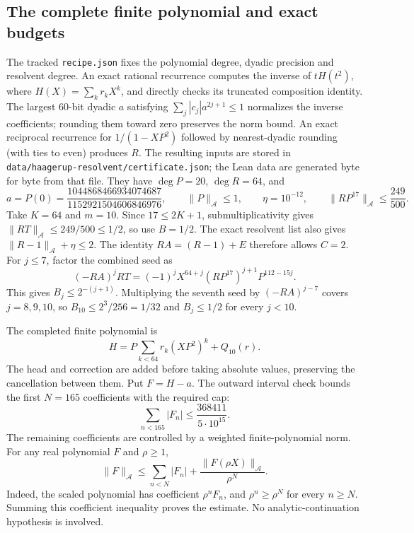 \subsection{The complete finite polynomial and exact budgets}
The tracked \texttt{recipe.json} fixes the polynomial degree, dyadic precision
and resolvent degree. An exact rational recurrence computes the inverse of
$tH(t^2)$, where $H(X)=\sum_k r_kX^k$, and directly checks its truncated
composition identity. The largest
$60$-bit dyadic $a$ satisfying $\sum_j|c_j|a^{2j+1}\le1$ normalizes the inverse
coefficients; rounding them toward zero preserves the norm bound. An exact
reciprocal recurrence for $1/(1-XP^2)$ followed by nearest-dyadic rounding
(with ties to even) produces $R$. The resulting inputs are stored in
\texttt{data/haagerup-resolvent/certificate.json}; the Lean data are generated
byte for byte from that file. They have $\deg P=20$, $\deg R=64$, and
\[
 a=P(0)=\frac{1044868466934074687}{1152921504606846976},\qquad
 \|P\|_{\mathcal A}\le1,\qquad
 \eta=10^{-12},\qquad \|RP^{17}\|_{\mathcal A}\le\frac{249}{500}.
\]
Take $K=64$ and $m=10$. Since $17\le2K+1$, submultiplicativity gives
$\|RT\|_{\mathcal A}\le249/500\le1/2$, so use $B=1/2$.
The exact resolvent list also gives $\|R-1\|_{\mathcal A}+\eta\le2$.
The identity $RA=(R-1)+E$ therefore allows $C=2$.
For $j\le7$, factor the combined seed as
\[
 (-RA)^jRT=(-1)^jX^{64+j}(RP^{17})^{j+1}P^{112-15j}.
\]
This gives $B_j\le2^{-(j+1)}$. Multiplying the seventh seed by
$(-RA)^{j-7}$ covers $j=8,9,10$, so $B_{10}\le2^3/256=1/32$
and $B_j\le1/2$ for every $j<10$.

The completed finite polynomial is
\[
 H=P\sum_{k<64}r_k(XP^2)^k+Q_{10}(r).
\]
The head and correction are added before taking absolute values, preserving
the cancellation between them. Put $F=H-a$. The outward interval check bounds
the first $N=165$ coefficients with the required cap:
\[
 \sum_{n<165}|F_n|\le\frac{368411}{5\cdot10^{15}}.
\]
The remaining coefficients are controlled by a weighted finite-polynomial
norm. For any real polynomial $F$ and $\rho\ge1$,
\[
 \|F\|_{\mathcal A}\le\sum_{n<N}|F_n|
       +\frac{\|F(\rho X)\|_{\mathcal A}}{\rho^N}.
\]
Indeed, the scaled polynomial has coefficient $\rho^nF_n$, and
$\rho^n\ge\rho^N$ for every $n\ge N$. Summing this coefficient inequality
proves the estimate. No analytic-continuation hypothesis is involved.

